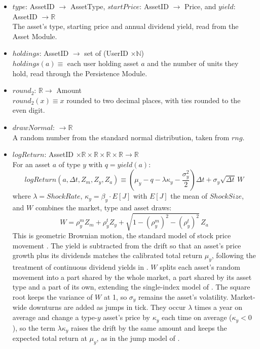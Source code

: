 \documentclass[12pt, titlepage]{article}
\begin{document}
\begin{itemize}
\item $\mathit{type}$: AssetID $\rightarrow$ AssetType,
  $\mathit{startPrice}$: AssetID $\rightarrow$ Price, and $\mathit{yield}$:
  AssetID $\rightarrow \mathbb{R}$\\
  The asset's type, starting price and annual dividend yield, read from the
  Asset Module.
\item $\mathit{holdings}$: AssetID $\rightarrow$ set of (UserID $\times
  \mathbb{N}$)\\
  $\mathit{holdings}(a) \equiv$ each user holding asset $a$ and the number of
  units they hold, read through the Persistence Module.
\item $\mathit{round}_2$: $\mathbb{R} \rightarrow$ Amount\\
  $\mathit{round}_2(x) \equiv x$ rounded to two decimal places, with ties
  rounded to the even digit.
\item $\mathit{drawNormal}$: $\rightarrow \mathbb{R}$\\
  A random number from the standard normal distribution, taken from
  $\mathit{rng}$.
\item $\mathit{logReturn}$: AssetID $\times \mathbb{R} \times \mathbb{R}
  \times \mathbb{R} \times \mathbb{R} \rightarrow \mathbb{R}$\\
  For an asset $a$ of type $y$ with $q = \mathit{yield}(a)$:
  \[
  \mathit{logReturn}(a, \Delta t, Z_m, Z_y, Z_a) \equiv
  \left(\mu_y - q - \lambda\kappa_y - \frac{\sigma_y^2}{2}\right)\Delta t
  + \sigma_y \sqrt{\Delta t}\, W
  \]
  where $\lambda = \mathit{ShockRate}$, $\kappa_y = \beta_y \cdot E[J]$ with
  $E[J]$ the mean of $\mathit{ShockSize}$, and $W$ combines the market, type
  and asset draws:
  \[
  W = \rho^m_y Z_m + \rho^t_y Z_y
  + \sqrt{1 - (\rho^m_y)^2 - (\rho^t_y)^2}\, Z_a
  \]
  This is geometric Brownian motion, the standard model of stock price
  movement \citep{Samuelson1965, BlackAndScholes1973}. The yield is
  subtracted from the drift so that an asset's price growth plus its
  dividends matches the calibrated total return $\mu_y$, following the
  treatment of continuous dividend yields in \citet{Merton1973}. $W$ splits
  each asset's random movement into a part shared by the whole market, a part
  shared by its asset type and a part of its own, extending the single-index
  model of \citet{Sharpe1963}. The square root keeps the variance of $W$ at 1,
  so $\sigma_y$ remains the asset's volatility. Market-wide downturns are added
  as jumps in tick. They occur $\lambda$ times a year on average and change a
  type-$y$ asset's price by $\kappa_y$ each time on average ($\kappa_y < 0$),
  so the term $\lambda\kappa_y$ raises the drift by the same amount and keeps
  the expected total return at $\mu_y$, as in the jump model of
  \citet{Merton1976}.
\end{itemize}
\end{document}
